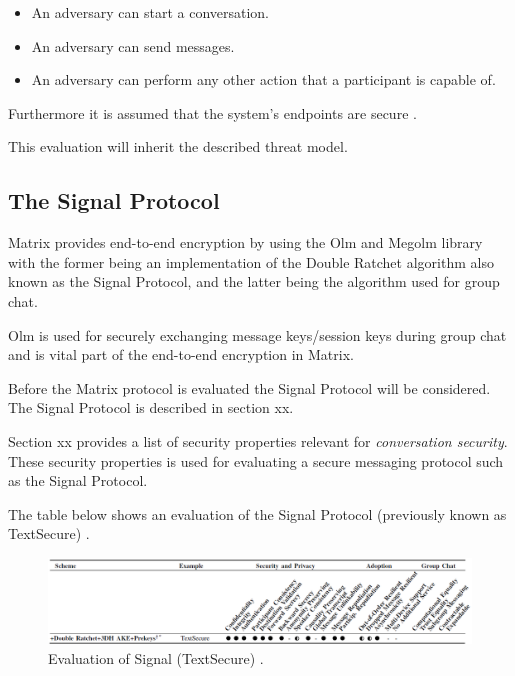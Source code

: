 \begin{itemize}
	\item An adversary can start a conversation.
	\item An adversary can send messages.
	\item An adversary can perform any other action that a participant is capable of.
\end{itemize}

Furthermore it is assumed that the system's endpoints are secure \cite{sok}.

This evaluation will inherit the described threat model.

\subsection{The Signal Protocol}
Matrix provides end-to-end encryption by using the Olm and Megolm library with the former being an implementation of the Double Ratchet algorithm also known as the Signal Protocol, and the latter being the algorithm used for group chat. 

Olm is used for securely exchanging message keys/session keys during group chat and is vital part of the end-to-end encryption in Matrix.

Before the Matrix protocol is evaluated the Signal Protocol will be considered. The Signal Protocol is described in section xx. 

Section xx provides a list of security properties relevant for \emph{conversation security}. These security properties is used for evaluating a secure messaging protocol such as the Signal Protocol.

The table below shows an evaluation of the Signal Protocol (previously known as TextSecure) \cite{sok}. 

\begin{figure}[H]
	\hspace*{-1.7cm} 
	\centering
	\includegraphics[width=16cm]{figures/framework_signal.png}
	\caption{Evaluation of Signal (TextSecure) \cite{sok}.}
	\label{fig:framework_signal}
\end{figure}


